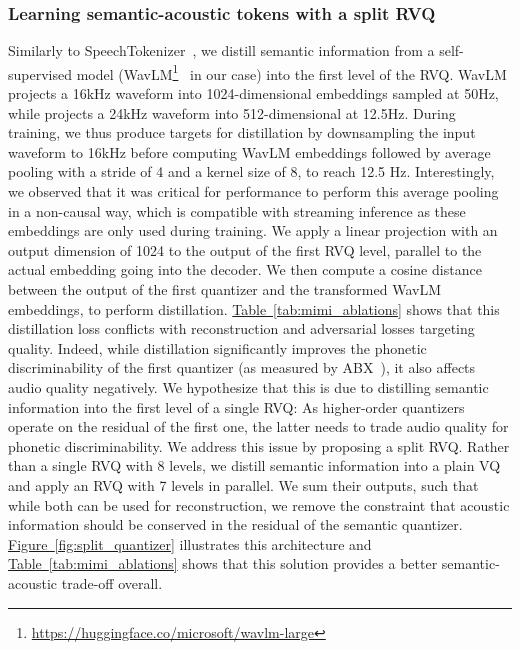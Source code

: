 \subsubsection{Learning semantic-acoustic tokens with a split RVQ}
\label{sec:splitrvq}
Similarly to SpeechTokenizer~\citep{zhang2024speechtokenizer}, we distill semantic information from a self-supervised model (WavLM\footnote{\url{https://huggingface.co/microsoft/wavlm-large}}~\citep{wavlm} in our case) into the first level of the RVQ. WavLM projects a 16kHz waveform into 1024-dimensional embeddings sampled at 50Hz, while \mimi projects a 24kHz waveform into 512-dimensional at 12.5Hz. During training, we thus produce targets for distillation by downsampling the input waveform to 16kHz before computing WavLM embeddings followed by average pooling with a stride of 4 and a kernel size of 8, to reach 12.5 Hz. Interestingly, we observed that it was critical for performance to perform this average pooling in a non-causal way, which is compatible with streaming inference as these embeddings are only used during training. We apply a linear projection with an output dimension of 1024 to the output of the first RVQ level, parallel to the actual embedding going into the decoder. We then compute a cosine distance between the output of the first quantizer and the transformed WavLM embeddings, to perform distillation. \hyperref[tab:mimi_ablations]{Table~\ref{tab:mimi_ablations}} shows that this distillation loss conflicts with reconstruction and adversarial losses targeting quality. Indeed, while distillation significantly improves the phonetic discriminability of the first quantizer (as measured by ABX~\citep{abx}), it also affects audio quality negatively. We hypothesize that this is due to distilling semantic information into the first level of a single RVQ: As higher-order quantizers operate on the residual of the first one, the latter needs to trade audio quality for phonetic discriminability. We address this issue by proposing a split RVQ. Rather than a single RVQ with 8 levels, we distill semantic information into a plain VQ and apply an RVQ with 7 levels in parallel. We sum their outputs, such that while both can be used for reconstruction, we remove the constraint that acoustic information should be conserved in the residual of the semantic quantizer. \hyperref[fig:split_quantizer]{Figure~\ref{fig:split_quantizer}} illustrates this architecture and \hyperref[tab:mimi_ablations]{Table~\ref{tab:mimi_ablations}} shows that this solution provides a better semantic-acoustic trade-off overall.


